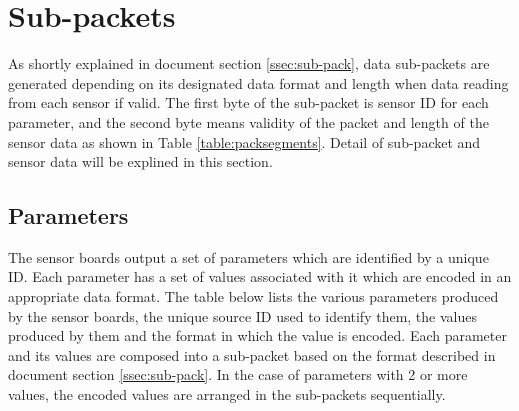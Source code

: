\newpage
\section{Sub-packets}

As shortly explained in document section \ref{ssec:sub-pack}, data sub-packets are generated depending on its designated data format and length when data reading from each sensor if valid. The first byte of the sub-packet is sensor ID for each parameter, and the second byte means validity of the packet and length of the sensor data as shown in Table \ref{table:packsegments}. Detail of sub-packet and sensor data will be explined in this section.


\subsection{Parameters}

The sensor boards output a set of parameters which are identified by a unique ID. Each parameter
has a set of values associated with it which are encoded in an appropriate data format. The table
below lists the various parameters produced by the sensor boards, the unique source ID used to identify them, the values produced by them and the format in which the value is encoded.
Each parameter and its values are composed into a sub-packet based on
the format described in document section \ref{ssec:sub-pack}.
In the case of parameters with 2 or more values, the encoded values are
arranged in the sub-packets sequentially. 


